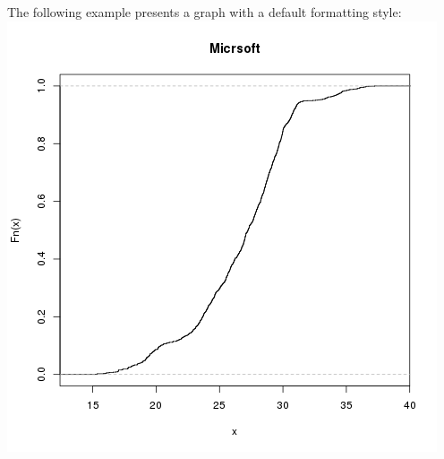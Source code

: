 \documentclass [twoside,
  11pt, a4paper,
  footinclude=true,
  headinclude=true,
  cleardoublepage=empty
]{article}
\begin{document}
The following example presents a graph with a default formatting style:
\includegraphics[scale=0.75]{img_examples/RPlotExample.png}
 
\end{document}
